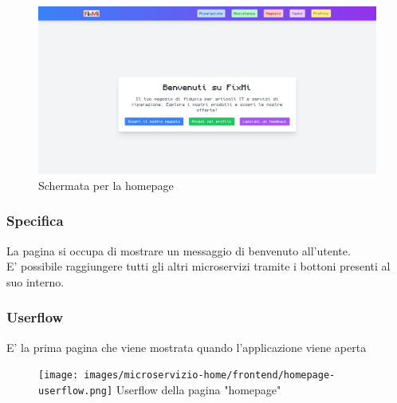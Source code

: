 \documentclass{report}
\begin{document}
\begin{figure}[H]
	\centering\includegraphics[width=1\textwidth]{images/microservizio-home/frontend/homepage.jpg}
	\caption{Schermata per la homepage}
\end{figure}
\subsubsection*{Specifica}
La pagina si occupa di mostrare un messaggio di benvenuto all'utente.\\ E' possibile raggiungere tutti gli altri microservizi tramite i bottoni presenti al suo interno.

\subsubsection*{Userflow}
E' la prima pagina che viene mostrata quando l'applicazione viene aperta
\begin{figure}[H]
	\centering\texttt{[image: images/microservizio-home/frontend/homepage-userflow.png]}
	Userflow della pagina "homepage"
\end{figure}
\end{document}
